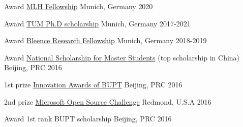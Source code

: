 




\begin{cvhonors}

\cvhonor
{Award} %
{\href{https://fellowship.mlh.io/}{MLH Fellowship} } %
{Munich, Germany} %
{2020} %

\cvhonor
{Award} %
{\href{}{TUM Ph.D scholarship} } %
{Munich, Germany} %
{2017-2021} %

\cvhonor
{Award} %
{\href{https://bleenco.com/}{Bleence Research Fellowship} } %
{Munich, Germany} %
{2018-2019} %

\cvhonor
{Award} %
{\href{http://sice.bupt.edu.cn/info/1008/1546.htm}{National Scholarship for Master Students} (top scholarship in China)} %
{Beijing, PRC} %
{2016} %

\cvhonor
{1st prize} %
{\href{http://my.bupt.edu.cn/detach.portal?.pmn=view&action=browser&.ia=false&.pen=pe1144&bulletinId=fc089be9-6d81-11e6-ae27-4f4915a784ea}{Innovation Awards of BUPT}} %
{Beijing, PRC} %
{2016} %


\cvhonor
{2nd prize} %
{\href{https://www.microsoft.com/en-us/research/academic-program/microsoft-open-source-challenge/}{Microsoft Open Source Challenge}} %
{Redmond, U.S.A} %
{2016} %


\cvhonor
{Award} %
{1st rank BUPT scholarship} %
{Beijing, PRC} %
{2016} %


\end{cvhonors}
